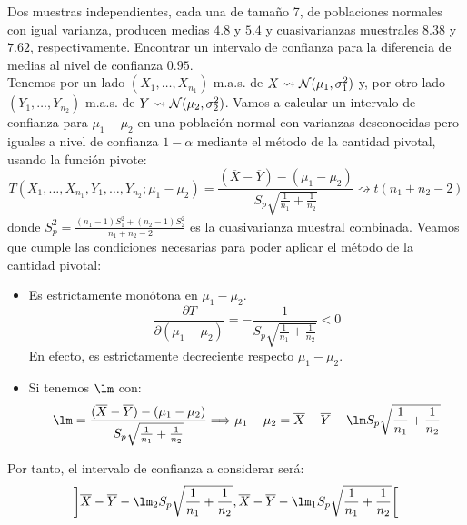 \begin{ejercicio}\label{ej:2.6.5}
    Dos muestras independientes, cada una de tamaño 7, de poblaciones normales con igual varianza, producen medias $4.8$ y $5.4$ y cuasivarianzas muestrales $8.38$ y $7.62$, respectivamente. Encontrar un intervalo de confianza para la diferencia de medias al nivel de confianza $0.95$.\\

    \noindent
    Tenemos por un lado $(X_1, \ldots, X_{n_1})$ m.a.s.  de $X\rightsquigarrow\mathcal{N}(\mu_1,\sigma^2_1)$ y, por otro lado $(Y_1, \ldots, Y_{n_2})$ m.a.s. de $Y\rightsquigarrow\mathcal{N}(\mu_2,\sigma_2^2)$. Vamos a calcular un intervalo de confianza para $\mu_1-\mu_2$ en una población normal con varianzas desconocidas pero iguales a nivel de confianza $1-\alpha$ mediante el método de la cantidad pivotal, usando la función pivote:
    \begin{equation*}
        T(X_1, \ldots, X_{n_1}, Y_1, \ldots, Y_{n_2}; \mu_1-\mu_2) = \frac{(\overline{X}-\overline{Y})-(\mu_1-\mu_2)}{S_p\sqrt{\frac{1}{n_1}+\frac{1}{n_2}}} \rightsquigarrow t(n_1+n_2-2)
    \end{equation*}
    donde $S_p^2 = \frac{(n_1-1)S_1^2 + (n_2-1)S_2^2}{n_1+n_2-2}$ es la cuasivarianza muestral combinada. Veamos que cumple las condiciones necesarias para poder aplicar el método de la cantidad pivotal:
    \begin{itemize}
        \item Es estrictamente monótona en $\mu_1-\mu_2$.
        \begin{equation*}
            \frac{\partial T}{\partial (\mu_1-\mu_2)} = -\frac{1}{S_p\sqrt{\frac{1}{n_1}+\frac{1}{n_2}}} < 0
        \end{equation*}
        En efecto, es estrictamente decreciente respecto $\mu_1-\mu_2$.
        \item Si tenemos $\lm$ con:
            \begin{equation*}
                \lm = \frac{(\overline{X}-\overline{Y})-(\mu_1-\mu_2)}{S_p\sqrt{\frac{1}{n_1}+\frac{1}{n_2}}}\Longrightarrow \mu_1-\mu_2 = \overline{X}-\overline{Y} - \lm S_p\sqrt{\frac{1}{n_1}+\frac{1}{n_2}}
            \end{equation*}
    \end{itemize}
    Por tanto, el intervalo de confianza a considerar será:
    \begin{equation*}
        \left]\overline{X}-\overline{Y}-\lm_2 S_p\sqrt{\frac{1}{n_1}+\frac{1}{n_2}},\overline{X}-\overline{Y}-\lm_1 S_p\sqrt{\frac{1}{n_1}+\frac{1}{n_2}}\right[

\end{equation*}
\end{ejercicio}
